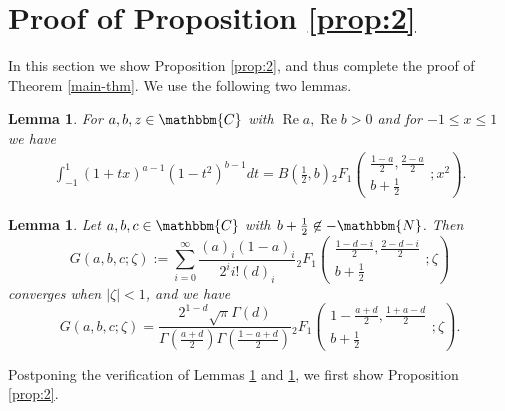\documentclass[12pt]{article}
\numberwithin{equation}{section}
\newcommand{\assign}{:=}
\newcommand{\nin}{\not\in}
\newcommand{\tmop}[1]{\ensuremath{\operatorname{#1}}}
\newtheorem{lemma}[corollary]{Lemma}
\newcommand{\mygrammarfootnote}[1]{}
\begin{document}
\section{Proof of Proposition \ref{prop:2}}\label{sec:3}

In this section we show Proposition \ref{prop:2}, and thus complete the proof
of Theorem \ref{main-thm}. We use the following two lemmas.

\begin{lemma}
  \label{lem4}For $a, b, z \in \mathbbm{C}$ with $\tmop{Re} a, \tmop{Re} b >
  0$ and for $- 1 \leqslant x \leqslant 1$ we have
  \begin{eqnarray}
    & \displaystyle\int_{- 1}^1 (1 + tx)^{a - 1} (1 - t^2)^{b - 1} d t = B \left(
    \frac{1}{2}, b \right){}_2 F_1 \left( \begin{array}{c}
      \displaystyle\frac{1 - a}{2}, \frac{2 - a}{2}\\
      b + \frac{1}{2}
    \end{array} ; x^2 \right) . &  \nonumber
  \end{eqnarray}
\end{lemma}

\begin{lemma}
  \label{lem:Fisum}Let $a, b, c \in \mathbbm{C}$ with $b + \frac{1}{2} \nin
  -\mathbbm{N}$. Then\mygrammarfootnote{maybe, we need a comma here?}
  \[ G (a, b, c ; \zeta) \assign \displaystyle\sum_{i = 0}^{\infty} \frac{(a)_i (1 -
     a)_i}{2^i i! (d)_i}{}_2 F_1 \left( \begin{array}{c}
       \displaystyle\frac{1 - d - i}{2}, \frac{2 - d - i}{2}\\
       b + \frac{1}{2}
     \end{array} ; \zeta \right) \]
  converges when $| \zeta | < 1$, and we have
  \begin{equation} G (a, b, c ; \zeta) = \frac{2^{1 - d} \sqrt{\pi} \Gamma (d)}{\Gamma
     \left( \frac{a + d}{2} \right) \Gamma \left( \frac{1 - a + d}{2} \right)}
    {}_2 F_1 \left( \begin{array}{c}
       \displaystyle1 - \frac{a + d}{2}, \frac{1 + a - d}{2}\\
       b + \frac{1}{2}
   \end{array} ; \zeta \right) .  \label{eqn:iF}\end{equation}
\end{lemma}

Postponing the verification of Lemmas \ref{lem4} and \ref{lem:Fisum}, we first
show Proposition \ref{prop:2}.
\end{document}
